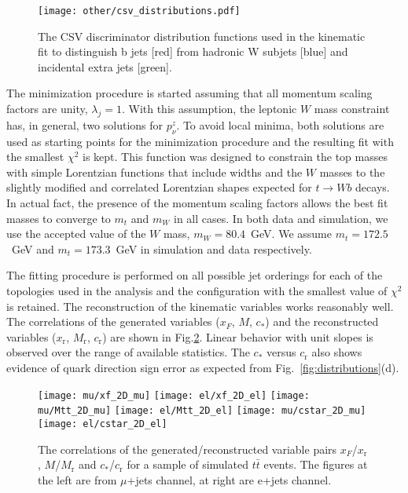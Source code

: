\documentclass{cmspaperpdf}
\begin{document}
\begin{figure}[hbt]
  \begin{center}
    \texttt{[image: other/csv\_distributions.pdf]}
  \caption{\small The CSV discriminator distribution functions used in the kinematic fit to distinguish b jets [red] from hadronic W subjets [blue] and incidental extra jets [green].}
    \label{fig:CSV_distributions}
  \end{center}
\end{figure}

The minimization procedure is started assuming that all momentum scaling factors are unity, $\lambda_j=1$.  With this assumption, the leptonic $W$ mass constraint has, in general, two solutions for $p_\nu^z$.  To avoid local minima, both solutions are used as starting points for the minimization procedure and the resulting fit with the smallest $\chi^2$ is kept.  This function was designed to constrain the top masses with simple Lorentzian functions that include widths and the $W$ masses to the slightly modified and correlated Lorentzian shapes expected for $t\to Wb$ decays.  In actual fact, the presence of the momentum scaling factors allows the best fit masses to converge to $m_t$ and $m_W$ in all cases. In both data and simulation, we use the accepted value of the $W$ mass, $m_W = 80.4$~GeV. We assume $m_t=172.5$~GeV and $m_t=173.3$~GeV in simulation and data respectively.

The fitting procedure is performed on all possible jet orderings for each of the topologies used in the analysis and the configuration with the smallest value of $\chi^2$ is retained.  The reconstruction of the kinematic variables works reasonably well.  The correlations of the generated variables ($x_F$, $M$, $c_*$) and the reconstructed variables ($x_\mathrm{r}$, $M_\mathrm{r}$, $c_\mathrm{r}$) are shown in Fig.\ref{fig:cost_reco}.  Linear behavior with unit slopes is observed over the range of available statistics.  The $c_*$ versus $c_\mathrm{r}$ also shows evidence of quark direction sign error as expected from Fig.~\ref{fig:distributions}(d).  

\begin{figure}[hbt]
  \begin{center}
    \texttt{[image: mu/xf\_2D\_mu]}
    \texttt{[image: el/xf\_2D\_el]}   
    \texttt{[image: mu/Mtt\_2D\_mu]}
    \texttt{[image: el/Mtt\_2D\_el]}
    \texttt{[image: mu/cstar\_2D\_mu]}
    \texttt{[image: el/cstar\_2D\_el]}
  \caption{\small The correlations of the generated/reconstructed variable pairs $x_F$/$x_\mathrm{r}$ , $M$/$M_\mathrm{r}$ and $c_*$/$c_\mathrm{r}$ for a sample of simulated $t\bar t$ events. The figures at the left are from $\mu$+jets channel, at right are e+jets channel.}
    \label{fig:cost_reco}
  \end{center}
\end{figure}
\end{document}
